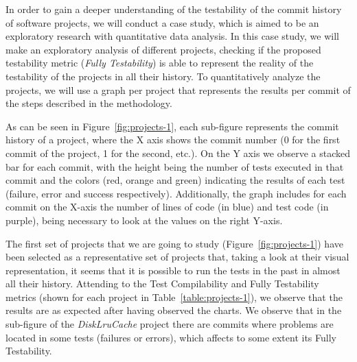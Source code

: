 In order to gain a deeper understanding of the testability of the commit history of software projects, we will conduct a case study, which is aimed to be an exploratory research with quantitative data analysis. 
In this case study, we will make an exploratory analysis of different projects, checking if the proposed testability metric (\textit{Fully Testability}) is able to represent the reality of the testability of the projects in all their history.
To quantitatively analyze the projects, we will use a graph per project that represents the results per commit of the steps described in the methodology. 

As can be seen in Figure~\ref{fig:projects-1}, each sub-figure represents the commit history of a project, where the X axis shows the commit number (0 for the first commit of the project, 1 for the second, etc.). On the Y axis we observe a stacked bar for each commit, with the height being the number of tests executed in that commit and the colors (red, orange and green) indicating the results of each test (failure, error and success respectively). Additionally, the graph includes for each commit on the X-axis the number of lines of code (in blue) and test code (in purple), being necessary to look at the values on the right Y-axis.


The first set of projects that we are going to study (Figure~\ref{fig:projects-1}) have been selected as a representative set of projects that, taking a look at their visual representation, it seems that it is possible to run the tests in the past in almost all their history.
Attending to the Test Compilability and Fully Testability metrics (shown for each project in Table~\ref{table:projects-1}), we observe that the results are as expected after having observed the charts.
We observe that in the sub-figure of the \textit{DiskLruCache} project there are commits where problems are located in some tests (failures or errors), which affects to some extent its Fully Testability.

